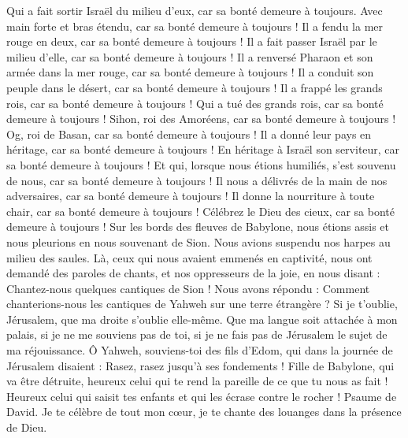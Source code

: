\begin{multicols}{2}
Qui a fait sortir Israël du milieu d'eux, car sa bonté demeure à toujours.
Avec main forte et bras étendu, car sa bonté demeure à toujours !
Il a fendu la mer rouge en deux, car sa bonté demeure à toujours !
Il a fait passer Israël par le milieu d'elle, car sa bonté demeure à toujours !
Il a renversé Pharaon et son armée dans la mer rouge, car sa bonté demeure à toujours !
Il a conduit son peuple dans le désert, car sa bonté demeure à toujours !
Il a frappé les grands rois, car sa bonté demeure à toujours !
Qui a tué des grands rois, car sa bonté demeure à toujours !
Sihon, roi des Amoréens, car sa bonté demeure à toujours !
Og, roi de Basan, car sa bonté demeure à toujours !
Il a donné leur pays en héritage, car sa bonté demeure à toujours !
En héritage à Israël son serviteur, car sa bonté demeure à toujours !
Et qui, lorsque nous étions humiliés, s'est souvenu de nous, car sa bonté demeure à toujours !
Il nous a délivrés de la main de nos adversaires, car sa bonté demeure à toujours !
Il donne la nourriture à toute chair, car sa bonté demeure à toujours !
Célébrez le Dieu des cieux, car sa bonté demeure à toujours !
\VerseOne{}Sur les bords des fleuves de Babylone, nous étions assis et nous pleurions en nous souvenant de Sion.
Nous avions suspendu nos harpes au milieu des saules.
Là, ceux qui nous avaient emmenés en captivité, nous ont demandé des paroles de chants, et nos oppresseurs de la joie, en nous disant : Chantez-nous quelques cantiques de Sion ! Nous avons répondu :
Comment chanterions-nous les cantiques de Yahweh sur une terre étrangère ?
Si je t'oublie, Jérusalem, que ma droite s'oublie elle-même.
Que ma langue soit attachée à mon palais, si je ne me souviens pas de toi, si je ne fais pas de Jérusalem le sujet de ma réjouissance.
Ô Yahweh, souviens-toi des fils d'Edom, qui dans la journée de Jérusalem disaient : Rasez, rasez jusqu’à ses fondements !
Fille de Babylone, qui va être détruite, heureux celui qui te rend la pareille de ce que tu nous as fait !
Heureux celui qui saisit tes enfants et qui les écrase contre le rocher !
\VerseOne{}Psaume de David. Je te célèbre de tout mon cœur, je te chante des louanges dans la présence de Dieu.

\end{multicols}
